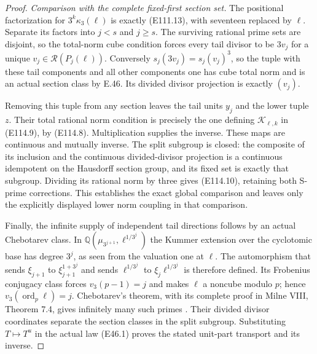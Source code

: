\begin{proof}
\emph{Comparison with the complete fixed-first section set.}
The positional factorization for $3^k\kappa_3(\ell)$
is exactly (E111.13), with seventeen replaced by
$\ell$. Separate its factors into $j<s$ and $j\ge s$.
The surviving rational prime sets are disjoint, so
the total-norm cube condition forces every tail
divisor to be $3v_j$ for a unique
$v_j\in\mathcal R(P_j(\ell))$.
Conversely $s_j(3v_j)=s_j(v_j)^3$, so the tuple
with these tail components and all other components
one has cube total norm and is an actual section
class by E.46. Its divided divisor projection is
exactly $(v_j)$.

Removing this tuple from any section leaves the
tail units $y_j$ and the lower tuple $z$.
Their total rational norm condition is precisely
the one defining $\mathcal K_{\ell,k}$ in (E114.9),
by (E114.8). Multiplication supplies the inverse.
These maps are continuous and mutually inverse.
The split subgroup is closed: the composite of
its inclusion and the continuous divided-divisor
projection is a continuous idempotent on the
Hausdorff section group, and its fixed set is
exactly that subgroup. Dividing its rational norm
by three gives (E114.10), retaining both S-prime
corrections. This establishes the exact global
comparison and leaves only the explicitly displayed
lower norm coupling in that comparison.

Finally, the infinite supply of independent tail
directions follows by an actual Chebotarev class.
In $\mathbb Q(\mu_{3^{j+1}},\ell^{1/3^j})$ the
Kummer extension over the cyclotomic base has degree
$3^j$, as seen from the valuation one at $\ell$.
The automorphism that sends $\xi_{j+1}$ to
$\xi_{j+1}^{1+3^j}$ and sends $\ell^{1/3^j}$ to
$\xi_j\ell^{1/3^j}$ is therefore defined. Its
Frobenius conjugacy class forces
$v_3(p-1)=j$ and makes $\ell$ a noncube modulo $p$;
hence $v_3(\operatorname{ord}_p\ell)=j$.
Chebotarev's theorem, with its complete proof in
Milne VIII, Theorem 7.4, gives infinitely many such
primes \cite{E_MilneCFT}. Their divided divisor
coordinates separate the section classes in the
split subgroup. Substituting $T\mapsto T^u$ in
the actual law (E46.1) proves the stated unit-part
transport and its inverse.
\end{proof}
